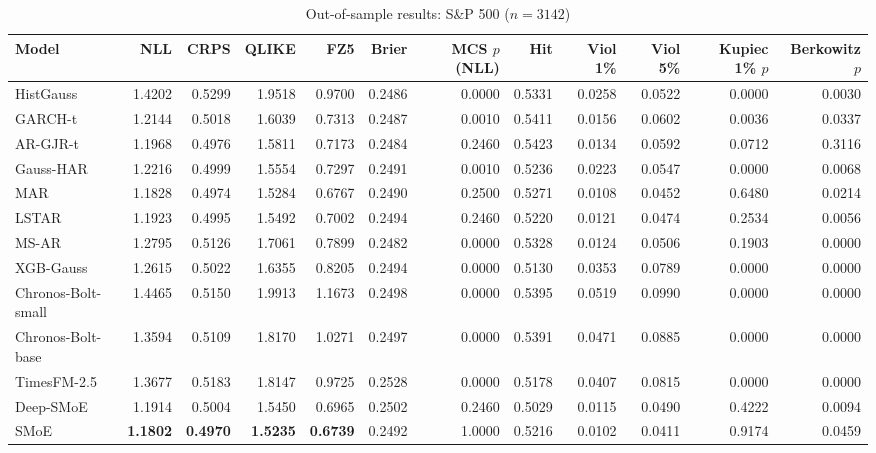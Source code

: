 \begin{table}[!htbp]\centering\scriptsize
\caption{Out-of-sample results: S\&P 500 ($n=3142$)}\label{tab:asset_spx}
\begin{adjustbox}{max width=\textwidth}
\begin{tabular}{lrrrrrrrrrrr}
\toprule
Model & NLL & CRPS & QLIKE & FZ5 & Brier & MCS $p$ (NLL) & Hit & Viol 1\% & Viol 5\% & Kupiec 1\% $p$ & Berkowitz $p$\\
\midrule
HistGauss & 1.4202 & 0.5299 & 1.9518 & 0.9700 & 0.2486 & 0.0000 & 0.5331 & 0.0258 & 0.0522 & 0.0000 & 0.0030\\
GARCH-t & 1.2144 & 0.5018 & 1.6039 & 0.7313 & 0.2487 & 0.0010 & 0.5411 & 0.0156 & 0.0602 & 0.0036 & 0.0337\\
AR-GJR-t & 1.1968 & 0.4976 & 1.5811 & 0.7173 & 0.2484 & 0.2460 & 0.5423 & 0.0134 & 0.0592 & 0.0712 & 0.3116\\
Gauss-HAR & 1.2216 & 0.4999 & 1.5554 & 0.7297 & 0.2491 & 0.0010 & 0.5236 & 0.0223 & 0.0547 & 0.0000 & 0.0068\\
MAR & 1.1828 & 0.4974 & 1.5284 & 0.6767 & 0.2490 & 0.2500 & 0.5271 & 0.0108 & 0.0452 & 0.6480 & 0.0214\\
LSTAR & 1.1923 & 0.4995 & 1.5492 & 0.7002 & 0.2494 & 0.2460 & 0.5220 & 0.0121 & 0.0474 & 0.2534 & 0.0056\\
MS-AR & 1.2795 & 0.5126 & 1.7061 & 0.7899 & 0.2482 & 0.0000 & 0.5328 & 0.0124 & 0.0506 & 0.1903 & 0.0000\\
XGB-Gauss & 1.2615 & 0.5022 & 1.6355 & 0.8205 & 0.2494 & 0.0000 & 0.5130 & 0.0353 & 0.0789 & 0.0000 & 0.0000\\
Chronos-Bolt-small & 1.4465 & 0.5150 & 1.9913 & 1.1673 & 0.2498 & 0.0000 & 0.5395 & 0.0519 & 0.0990 & 0.0000 & 0.0000\\
Chronos-Bolt-base & 1.3594 & 0.5109 & 1.8170 & 1.0271 & 0.2497 & 0.0000 & 0.5391 & 0.0471 & 0.0885 & 0.0000 & 0.0000\\
TimesFM-2.5 & 1.3677 & 0.5183 & 1.8147 & 0.9725 & 0.2528 & 0.0000 & 0.5178 & 0.0407 & 0.0815 & 0.0000 & 0.0000\\
Deep-SMoE & 1.1914 & 0.5004 & 1.5450 & 0.6965 & 0.2502 & 0.2460 & 0.5029 & 0.0115 & 0.0490 & 0.4222 & 0.0094\\
SMoE & \textbf{1.1802} & \textbf{0.4970} & \textbf{1.5235} & \textbf{0.6739} & 0.2492 & 1.0000 & 0.5216 & 0.0102 & 0.0411 & 0.9174 & 0.0459\\
\bottomrule
\end{tabular}
\end{adjustbox}
\end{table}